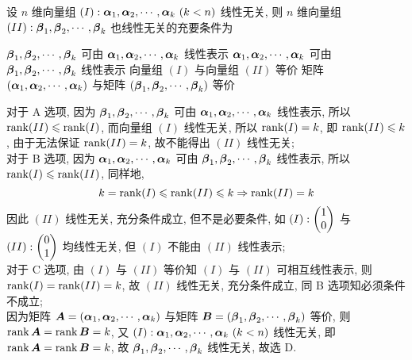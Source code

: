 \begin{example}
    设 $n$ 维向量组 $(I):\vb*{\alpha}_1,\vb*{\alpha}_2,\cdots,\vb*{\alpha}_k~ (k<n)$ 线性无关, 则 $n$ 维向量组 $(II):\vb*{\beta}_1,\vb*{\beta}_2,\cdots,\vb*{\beta}_k$ 也线性无关的充要条件为
    \begin{tasks}
        \task $\vb*{\beta}_1,\vb*{\beta}_2,\cdots,\vb*{\beta}_k$ 可由 $\vb*{\alpha}_1,\vb*{\alpha}_2,\cdots,\vb*{\alpha}_k$ 线性表示
        \task $\vb*{\alpha}_1,\vb*{\alpha}_2,\cdots,\vb*{\alpha}_k$ 可由 $\vb*{\beta}_1,\vb*{\beta}_2,\cdots,\vb*{\beta}_k$ 线性表示
        \task 向量组 $(I)$ 与向量组 $(II)$ 等价
        \task 矩阵 $(\vb*{\alpha}_1,\vb*{\alpha}_2,\cdots,\vb*{\alpha}_k)$ 与矩阵 $(\vb*{\beta}_1,\vb*{\beta}_2,\cdots,\vb*{\beta}_k)$ 等价
    \end{tasks}
\end{example}
\begin{solution}
    对于 A 选项, 因为 $\vb*{\beta}_1,\vb*{\beta}_2,\cdots,\vb*{\beta}_k$ 可由 $\vb*{\alpha}_1,\vb*{\alpha}_2,\cdots,\vb*{\alpha}_k$ 线性表示, 所以 $\rank(II)\leqslant \rank(I)$, 而向量组 $(I)$ 线性无关, 
    所以 $\rank(I)=k$, 即 $\rank(II)\leqslant k$, 由于无法保证 $\rank(II)=k$, 故不能得出 $(II)$ 线性无关;\\
    对于 B 选项, 因为 $\vb*{\alpha}_1,\vb*{\alpha}_2,\cdots,\vb*{\alpha}_k$ 可由 $\vb*{\beta}_1,\vb*{\beta}_2,\cdots,\vb*{\beta}_k$ 线性表示, 所以 $\rank(I)\leqslant \rank(II)$, 同样地, 
    $$k=\rank(I)\leqslant\rank(II)\leqslant k\Rightarrow \rank(II)=k$$
    因此 $(II)$ 线性无关, 充分条件成立, 但不是必要条件, 如 $(I):\mqty(1\\0)$ 与 $(II):\mqty(0\\1)$ 均线性无关, 但 $(I)$ 不能由 $(II)$ 线性表示;\\
    对于 C 选项, 由 $(I)$ 与 $(II)$ 等价知 $(I)$ 与 $(II)$ 可相互线性表示, 则 $\rank(I)=\rank(II)=k$, 故 $(II)$ 线性无关, 充分条件成立, 同 B 选项知必须条件不成立;\\
    因为矩阵 $\vb*{A}=(\vb*{\alpha}_1,\vb*{\alpha}_2,\cdots,\vb*{\alpha}_k)$ 与矩阵 $\vb*{B}=(\vb*{\beta}_1,\vb*{\beta}_2,\cdots,\vb*{\beta}_k)$ 等价, 则 $\rank\vb*{A}=\rank\vb*{B}=k$, 
    又 $(I):\vb*{\alpha}_1,\vb*{\alpha}_2,\cdots,\vb*{\alpha}_k~ (k<n)$ 线性无关, 即 $\rank\vb*{A}=\rank\vb*{B}=k$, 故 $\vb*{\beta}_1,\vb*{\beta}_2,\cdots,\vb*{\beta}_k$ 线性无关, 故选 D.
\end{solution}

